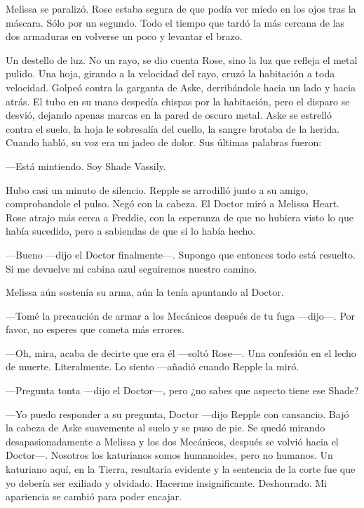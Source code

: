 {Melissa se paralizó. Rose estaba segura de que podía ver miedo en los
	ojos tras la máscara. Sólo por un segundo. Todo el tiempo que tardó la
	más cercana de las dos armaduras en volverse un poco y levantar el
brazo.}

{Un destello de luz. No un rayo, se dio cuenta Rose, sino la luz que
	refleja el metal pulido. Una hoja, girando a la velocidad del rayo,
	cruzó la habitación a toda velocidad. Golpeó contra la garganta de Aske,
	derribándole hacia un lado y hacia atrás. El tubo en su mano despedía
	chispas por la habitación, pero el disparo se desvió, dejando apenas
	marcas en la pared de oscuro metal. Aske se estrelló contra el suelo, la
	hoja le sobresalía del cuello, la sangre brotaba de la herida. Cuando
habló, su voz era un jadeo de dolor. Sus últimas palabras fueron:}

{---Está mintiendo. Soy Shade Vassily.}

{Hubo casi un minuto de silencio. Repple se arrodilló junto a su amigo,
	comprobandole el pulso. Negó con la cabeza. El Doctor miró a Melissa
	Heart. Rose atrajo más cerca a Freddie, con la esperanza de que no
	hubiera visto lo que había sucedido, pero a sabiendas de que sí lo había
hecho.}

{---Bueno ---dijo el Doctor finalmente---. Supongo que entonces todo
está resuelto. Si me devuelve mi cabina azul seguiremos nuestro camino.}

{Melissa aún sostenía su arma, aún la tenía apuntando al Doctor.}

{---Tomé la precaución de armar a los Mecánicos después de tu fuga
---dijo---. Por favor, no esperes que cometa más errores.}

{---Oh, mira, acaba de decirte que era él ---soltó Rose---. Una
	confesión en el lecho de muerte. Literalmente. Lo siento ---añadió
cuando Repple la miró.}

{---Pregunta tonta ---dijo el Doctor---, pero ¿no sabes que aspecto
tiene ese Shade?}

{---Yo puedo responder a su pregunta, Doctor ---dijo Repple con
	cansancio. Bajó la cabeza de Aske suavemente al suelo y se puso de pie.
	Se quedó mirando desapasionadamente a Melissa y los dos Mecánicos,
	después se volvió hacia el Doctor---. Nosotros los katurianos somos
	humanoides, pero no humanos. Un katuriano aquí, en la Tierra, resultaría
	evidente y la sentencia de la corte fue que yo debería ser exiliado y
	olvidado. Hacerme insignificante. Deshonrado. Mi apariencia se cambió
para poder encajar.}

